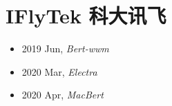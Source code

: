 \section{IFlyTek 科大讯飞}

\begin{itemize}
    \item 2019 Jun, \textit{Bert-wwm}\cite{Bert-wwm}
    \item 2020 Mar, \textit{Electra}\cite{Electra}
    \item 2020 Apr, \textit{MacBert}\cite{MacBert}
\end{itemize}
